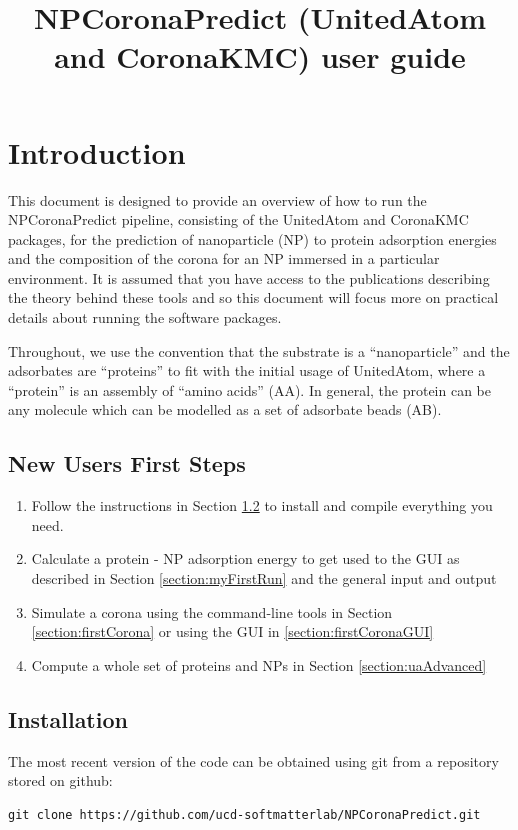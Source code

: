 \documentclass[10pt,a4paper,onecolumn]{report}
\begin{document}
\title{NPCoronaPredict (UnitedAtom and CoronaKMC) user guide}

\maketitle 

\tableofcontents

\chapter{Introduction}
This document is designed to provide an overview of how to run the NPCoronaPredict pipeline, consisting of the UnitedAtom and CoronaKMC packages, for the prediction of nanoparticle (NP) to protein adsorption energies and the composition of the corona for an NP immersed in a particular environment. It is assumed that you have access to the publications describing the theory behind these tools and so this document will focus more on practical details about running the software packages.

Throughout, we use the convention that the substrate is a ``nanoparticle'' and the adsorbates are ``proteins'' to fit with the initial usage of UnitedAtom, where a ``protein'' is an assembly of ``amino acids'' (AA). In general, the protein can be any molecule which can be modelled as a set of adsorbate beads (AB).

\section{New Users First Steps}
\begin{enumerate}
\item Follow the instructions in Section \ref{section:installation} to install and compile everything you need.
\item Calculate a protein - NP adsorption energy to get used to the GUI as described in Section \ref{section:myFirstRun} and the general input and output
\item Simulate a corona using the command-line tools in Section \ref{section:firstCorona} or using the GUI in \ref{section:firstCoronaGUI}
\item Compute a whole set of proteins and NPs in Section \ref{section:uaAdvanced}
\end{enumerate}


\section{Installation} \label{section:installation}
The most recent version of the code can be obtained using git from a repository stored on github:
\begin{lstlisting}
git clone https://github.com/ucd-softmatterlab/NPCoronaPredict.git
\end{lstlisting}
\end{document}
